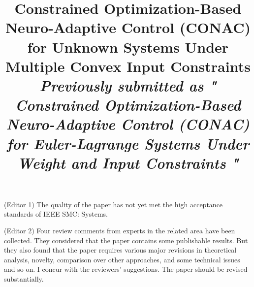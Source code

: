 \documentclass[12pt,english]{reviewresponse}
\title{
  Constrained Optimization-Based Neuro-Adaptive Control (CONAC) for Unknown Systems Under Multiple Convex Input Constraints
  \\
  \textit{
  \small{
    Previously submitted as "
	  Constrained Optimization-Based Neuro-Adaptive Control (CONAC) for Euler-Lagrange Systems Under Weight and Input Constraints
  "
  }
  }
}
\author{
	\DIFdelbegin \DIFdel{\_\_\_\_\_\_\_\_\_\_\_\_\_\_\_\_\_\_\_\_\_\_\_\_\_\_\_\_\_\_\_\_\_\_\_\_\_\_\_\_\_\_\_\_\_\_\_\_\_\_
}\DIFdelend \DIFaddbegin \DIFadd{Anonymous Authors
}\DIFaddend }
\begin{document}
\maketitle



% 

\newpage
\tableofcontents

\editor

\begin{generalcomment}

  (Editor 1) The quality of the paper has not yet met the high acceptance standards of IEEE SMC: Systems.

  (Editor 2) Four review comments from experts in the related area have been collected. They considered that the paper contains some publishable results. But they also found that the paper requires various major revisions in theoretical analysis, novelty, comparison over other approaches, and some technical issues and so on. I concur with the reviewers' suggestions. The paper should be revised substantially.

\end{generalcomment}
\end{document}
